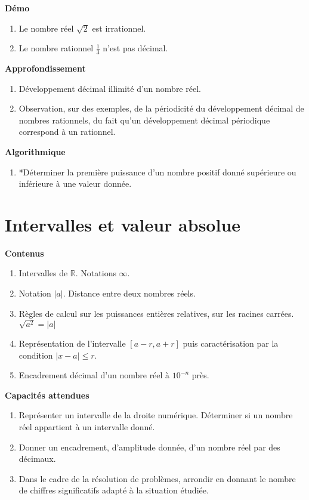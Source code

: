 \documentclass[10pt,a4paper]{article}
\begin{document}
\textbf{Démo}

\begin{enumerate}
\item   Le nombre réel $\sqrt 2 $ est irrationnel.
\item   Le nombre rationnel $\frac13$ n'est pas décimal.
\end{enumerate}



\textbf{Approfondissement}

\begin{enumerate}
\item Développement décimal illimité d'un nombre réel.
\item  Observation, sur des exemples, de la périodicité du développement décimal de nombres rationnels, du fait qu'un développement décimal périodique correspond à un rationnel.
\end{enumerate}


\textbf{Algorithmique}

\begin{enumerate}
\item *Déterminer la première puissance d'un nombre positif donné supérieure ou inférieure à une valeur donnée.
\end{enumerate}


\section{Intervalles et valeur absolue}

\textbf{Contenus}
\begin{enumerate}
\item Intervalles de  $\mathbb{R}$. Notations $\infty$.
\item Notation $|a|$. Distance entre deux nombres réels.
\item Règles de calcul sur les puissances entières relatives, sur les racines carrées. $\sqrt {a^2} = |a|$ 
\item Représentation de l'intervalle $[a - r , a + r]$ puis caractérisation par la condition $|x - a| \leq r$.
\item  Encadrement décimal d'un nombre réel à $10^{-n}$ près.
\end{enumerate}

\textbf{Capacités attendues}

\begin{enumerate}
\item Représenter un intervalle de la droite numérique. Déterminer si un nombre réel appartient à un intervalle donné.
\item  Donner un encadrement, d'amplitude donnée, d’un nombre réel par des décimaux.
\item  Dans le cadre de la résolution de problèmes, arrondir en donnant le nombre de chiffres significatifs adapté à la situation étudiée.
\end{enumerate}
\end{document}
